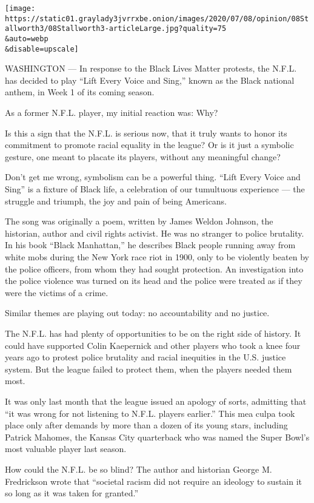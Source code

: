 \texttt{[image: https://static01.graylady3jvrrxbe.onion/images/2020/07/08/opinion/08Stallworth3/08Stallworth3-articleLarge.jpg?quality=75\\\&auto=webp\\\&disable=upscale]}

WASHINGTON --- In response to the Black Lives Matter protests, the
N.F.L. has decided to play ``Lift Every Voice and Sing,'' known as the
Black national anthem, in Week 1 of its coming season.

As a former N.F.L. player, my initial reaction was: Why?

Is this a sign that the N.F.L. is serious now, that it truly wants to
honor its commitment to promote racial equality in the league? Or is it
just a symbolic gesture, one meant to placate its players, without any
meaningful change?

Don't get me wrong, symbolism can be a powerful thing. ``Lift Every
Voice and Sing'' is a fixture of Black life, a celebration of our
tumultuous experience --- the struggle and triumph, the joy and pain of
being Americans.

The song was originally a poem, written by James Weldon Johnson, the
historian, author and civil rights activist. He was no stranger to
police brutality. In his book ``Black Manhattan,'' he describes Black
people running away from white mobs during the New York race riot in
1900, only to be violently beaten by the police officers, from whom they
had sought protection. An investigation into the police violence was
turned on its head and the police were treated as if they were the
victims of a crime.

Similar themes are playing out today: no accountability and no justice.

The N.F.L. has had plenty of opportunities to be on the right side of
history. It could have supported Colin Kaepernick and other players who
took a knee four years ago to protest police brutality and racial
inequities in the U.S. justice system. But the league failed to protect
them, when the players needed them most.

It was only last month that the league issued an apology of sorts,
admitting that ``it was wrong for not listening to N.F.L. players
earlier.'' This mea culpa took place only after demands by more than a
dozen of its young stars, including Patrick Mahomes, the Kansas City
quarterback who was named the Super Bowl's most valuable player last
season.

How could the N.F.L. be so blind? The author and historian George M.
Fredrickson wrote that ``societal racism did not require an ideology to
sustain it so long as it was taken for granted.''

